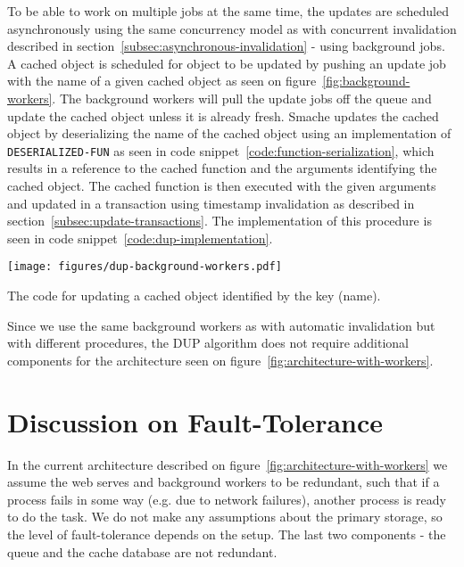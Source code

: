 To be able to work on multiple jobs at the same time, the updates are scheduled asynchronously using the same concurrency model as with concurrent invalidation described in section~\ref{subsec:asynchronous-invalidation} - using background jobs. A cached object is scheduled for object to be updated by pushing an update job with the name of a given cached object as seen on figure~\ref{fig:background-workers}. The background workers will pull the update jobs off the queue and update the cached object unless it is already fresh. Smache updates the cached object by deserializing the name of the cached object using an implementation of \verb$DESERIALIZED-FUN$ as seen in code snippet~\ref{code:function-serialization}, which results in a reference to the cached function and the arguments identifying the cached object. The cached function is then executed with the given arguments and updated in a transaction using timestamp invalidation as described in section~\ref{subsec:update-transactions}. The implementation of this procedure is seen in code snippet~\ref{code:dup-implementation}.

\begin{figure*}[ht!]
  \centering
  \texttt{[image: figures/dup-background-workers.pdf]}
  \caption{How Smache schedules cached objects to be updated using background workers}
  \label{fig:dup-background-workers}
\end{figure*}

\begin{code}{The code for updating a cached object identified by the key (name).}
  \centering
  
  \label{code:dup-implementation}
\end{code}

Since we use the same background workers as with automatic invalidation but with different procedures, the DUP algorithm does not require additional components for the architecture seen on figure~\ref{fig:architecture-with-workers}.


\section{Discussion on Fault-Tolerance}
\label{sec:discussion-on-fault-tolerance}

In the current architecture described on figure~\ref{fig:architecture-with-workers} we assume the web serves and background workers to be redundant, such that if a process fails in some way (e.g. due to network failures), another process is ready to do the task. We do not make any assumptions about the primary storage, so the level of fault-tolerance depends on the setup. The last two components - the queue and the cache database are not redundant.

